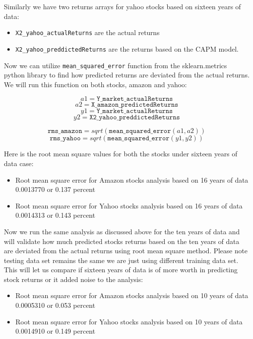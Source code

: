 Similarly we have two returns arrays for yahoo stocks based on sixteen years of data: 

\begin{itemize} 
\item \texttt{X2\_yahoo\_actualReturns} are the actual returns 
\item  \texttt{X2\_yahoo\_preddictedReturns} are the returns based on the CAPM model. 
\end{itemize}

Now we can utilize \texttt{mean\_squared\_error} function from the sklearn.metrics python library to find how predicted returns are deviated from the 
actual returns. We will run this function on both stocks, amazon and yahoo:

$$ a1 = \texttt{Y\_market\_actualReturns} $$
$$ a2 = \texttt{X\_amazon\_predictedReturns} $$
$$ y1 = \texttt{Y\_market\_actualReturns} $$
$$ y2 = \texttt{X2\_yahoo\_preddictedReturns} $$

$$ \texttt{rms\_amazon} = sqrt(\texttt{mean\_squared\_error}(a1,a2)) $$
$$ \texttt{rms\_yahoo}  = sqrt(\texttt{mean\_squared\_error}(y1,y2 ))$$

Here is the root mean square values for both the stocks under sixteen years of data case:

\begin{itemize} 
\item Root mean square error for Amazon stocks analysis based on 16 years of data 0.0013770 or 0.137 percent 
\item Root mean square error for Yahoo stocks analysis based on 16 years of data  0.0014313 or 0.143 percent 
\end{itemize} 

Now we run the same analysis as discussed above for the ten years of data and will validate how much predicted stocks returns 
based on the ten years of data are deviated from the actual returns using root mean square method. 
Please note testing data set remains the same we are just using different training data set. 
This will let us compare if sixteen years of data is of more worth in predicting stock returns or it added noise to the analysis:

\begin{itemize} 
\item Root mean square error for Amazon stocks analysis based on 10 years of data 0.0005310 or 0.053 percent 
\item Root mean square error for Yahoo stocks analysis based on 10 years of data  0.0014910 or 0.149 percent 
\end{itemize}  

